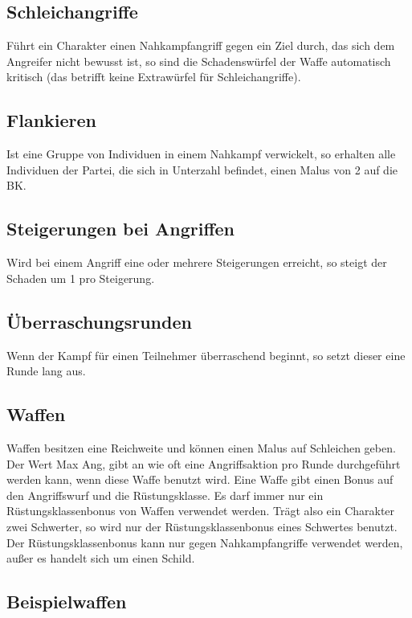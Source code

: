 \documentclass[../../Heldenanleitung2]{subfiles}
\begin{document}
\subsection{Schleichangriffe}
Führt ein Charakter einen Nahkampfangriff gegen ein Ziel durch, das sich dem Angreifer nicht bewusst ist, so sind die Schadenswürfel der Waffe automatisch kritisch (das betrifft keine Extrawürfel für Schleichangriffe).

\subsection{Flankieren}
Ist eine Gruppe von Individuen in einem Nahkampf verwickelt, so erhalten alle Individuen der Partei, die sich in Unterzahl befindet, einen Malus von 2 auf die BK.



\subsection{Steigerungen bei Angriffen}
Wird bei einem Angriff eine oder mehrere Steigerungen erreicht, so steigt der Schaden um 1 pro Steigerung.

\subsection{Überraschungsrunden}
Wenn der Kampf für einen Teilnehmer überraschend beginnt, so setzt dieser eine Runde lang aus.

\subsection{Waffen}
Waffen besitzen eine Reichweite und können einen Malus auf Schleichen geben. Der Wert Max Ang, gibt an wie oft eine Angriffsaktion pro Runde durchgeführt werden kann, wenn diese Waffe benutzt wird. Eine Waffe gibt einen Bonus auf den Angriffswurf und die Rüstungsklasse. Es darf immer nur ein Rüstungsklassenbonus von Waffen verwendet werden. Trägt also ein Charakter zwei Schwerter, so wird nur der Rüstungsklassenbonus eines Schwertes benutzt. Der Rüstungsklassenbonus kann nur gegen Nahkampfangriffe verwendet werden, außer es handelt sich um einen Schild.

\subsection{Beispielwaffen}
\end{document}
